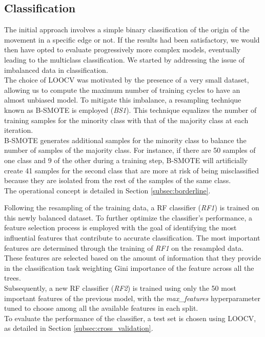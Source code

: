 \subsection{Classification}
The initial approach involves a simple binary classification of the origin of the movement in a specific edge or not.
If the results had been satisfactory, we would then have opted to evaluate progressively more complex models, eventually leading to the multiclass classification.
We started by addressing the issue of imbalanced data in classification.\\
The choice of LOOCV was motivated by the presence of a very small dataset, allowing us to compute the maximum number of training cycles to have an almost unbiased model.
To mitigate this imbalance, a resampling technique known as B-SMOTE is employed (\textit{BS1}). 
This technique equalizes the number of training samples for the minority class with that of the majority class at each iteration.\\
B-SMOTE generates additional samples for the minority class to balance the number of samples of the majority class.
For instance, if there are 50 samples of one class and 9 of the other during a training step, B-SMOTE will artificially create 41 samples for the second class that are more at risk of being misclassified because they are isolated from the rest of the samples of the same class. \\
The operational concept is detailed in Section \ref{subsec:borderline}.

Following the resampling of the training data, a RF classifier (\textit{RF1}) is trained on this newly balanced dataset.
To further optimize the classifier's performance, a feature selection process is employed with the goal of identifying the most influential features that contribute to accurate classification.
The most important features are determined through the training of \textit{RF1} on the resampled data. 
These features are selected based on the amount of information that they provide in the classification task weighting Gini importance of the feature across all the trees. \\
Subsequently, a new RF classifier (\textit{RF2}) is trained using only the 50 most important features of the previous model, with the \textit{max\_features} hyperparameter tuned to choose among all the available features in each split.\\
To evaluate the performance of the classifier, a test set is chosen using LOOCV, as detailed in Section \ref{subsec:cross_validation}. 

